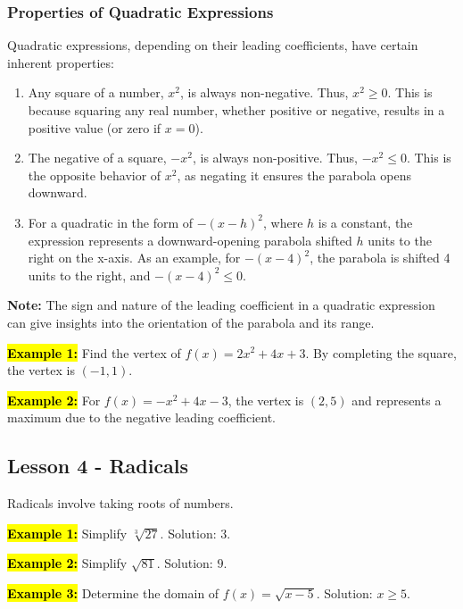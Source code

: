 \documentclass[12pt,a4paper]{article}
\begin{document}
\subsubsection*{Properties of Quadratic Expressions}

Quadratic expressions, depending on their leading coefficients, have certain inherent properties:

\begin{enumerate}
    \item Any square of a number, \(x^2\), is always non-negative. Thus, \(x^2 \geq 0\). This is because squaring any real number, whether positive or negative, results in a positive value (or zero if \(x = 0\)).
    
    \item The negative of a square, \(-x^2\), is always non-positive. Thus, \(-x^2 \leq 0\). This is the opposite behavior of \(x^2\), as negating it ensures the parabola opens downward.
    
    \item For a quadratic in the form of \(-(x-h)^2\), where \(h\) is a constant, the expression represents a downward-opening parabola shifted \(h\) units to the right on the x-axis. As an example, for \(-(x-4)^2\), the parabola is shifted 4 units to the right, and \(-(x-4)^2 \leq 0\).
\end{enumerate}

\textbf{Note:} The sign and nature of the leading coefficient in a quadratic expression can give insights into the orientation of the parabola and its range.

\textbf{\hl{Example 1:}} Find the vertex of \(f(x) = 2x^2 + 4x + 3\). By completing the square, the vertex is \((-1, 1)\).

\textbf{\hl{Example 2:}} For \(f(x) = -x^2 + 4x - 3\), the vertex is \((2, 5)\) and represents a maximum due to the negative leading coefficient.

\subsection*{Lesson 4 - Radicals}
Radicals involve taking roots of numbers.

\textbf{\hl{Example 1:}} Simplify \(\sqrt[3]{27}\). Solution: \(3\).

\textbf{\hl{Example 2:}} Simplify \(\sqrt{81}\). Solution: \(9\).

\textbf{\hl{Example 3:}} Determine the domain of \(f(x) = \sqrt{x - 5}\). Solution: \(x \geq 5\).
\end{document}
